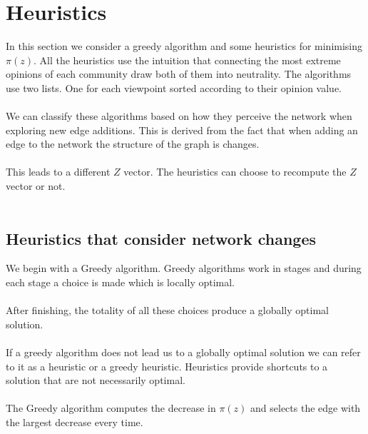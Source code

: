 \section{Heuristics}
\label{sec:heuristics}

In this section we  consider a greedy algorithm and some heuristics for minimising $\pi(z)$. All the heuristics use the intuition that connecting the most extreme opinions of each community draw both of them into neutrality. The algorithms use two lists. One for each viewpoint sorted according to their opinion value. 
\\
\\
We can classify these algorithms based on how they perceive the network when exploring new edge additions. This is derived from the fact that when adding an edge to the network the structure of the graph is changes. 
\\
\\
This leads to a different $Z$ vector. The heuristics can choose to recompute the $Z$ vector or not.
\\
\\

\subsection{Heuristics that consider network changes}
\label{sec:netChanges}

We begin with a Greedy algorithm. Greedy algorithms work in stages and during each stage a choice is made which is locally optimal.
\\
\\
After finishing, the totality of all these choices produce a globally optimal solution.
\\
\\
If a greedy algorithm does not lead us to a globally optimal solution we can refer to it as a heuristic or a greedy heuristic. Heuristics provide shortcuts to a solution that are not necessarily optimal.
\\
\\
The Greedy algorithm computes the decrease in $\pi(z)$ and selects the edge with the largest decrease every time.
\\
\\

